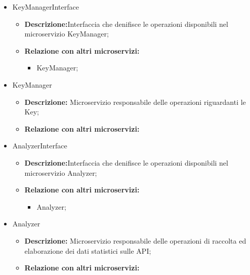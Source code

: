 {\begin{itemize}
  \begin{itemize}
  \item \textbf{Descrizione:} Microservizio responsabile delle operazioni riguardanti gli utenti;
    \item \textbf{Relazione con altri microservizi:}
      \begin{itemize}
        \item KeyManager;
        \item Analyzer;
      \end{itemize}
  \end{itemize}
\item KeyManagerInterface
  \begin{itemize}
  \item \textbf{Descrizione:}Interfaccia che denifisce le operazioni disponibili nel microservizio KeyManager;
    \item \textbf{Relazione con altri microservizi:}
      \begin{itemize}
      \item KeyManager;
      \end{itemize}
  \end{itemize}
\item KeyManager
  \begin{itemize}
  \item \textbf{Descrizione:} Microservizio responsabile delle operazioni riguardanti le Key;
    \item \textbf{Relazione con altri microservizi:}
  \end{itemize}
\item AnalyzerInterface
  \begin{itemize}
  \item \textbf{Descrizione:}Interfaccia che denifisce le operazioni disponibili nel microservizio Analyzer;
    \item \textbf{Relazione con altri microservizi:}
      \begin{itemize}
      \item Analyzer;
      \end{itemize}
  \end{itemize}
\item Analyzer
  \begin{itemize}
  \item \textbf{Descrizione:} Microservizio responsabile delle operazioni di raccolta ed elaborazione dei dati statistici sulle API;
    \item \textbf{Relazione con altri microservizi:}
  \end{itemize}

\end{itemize}}
